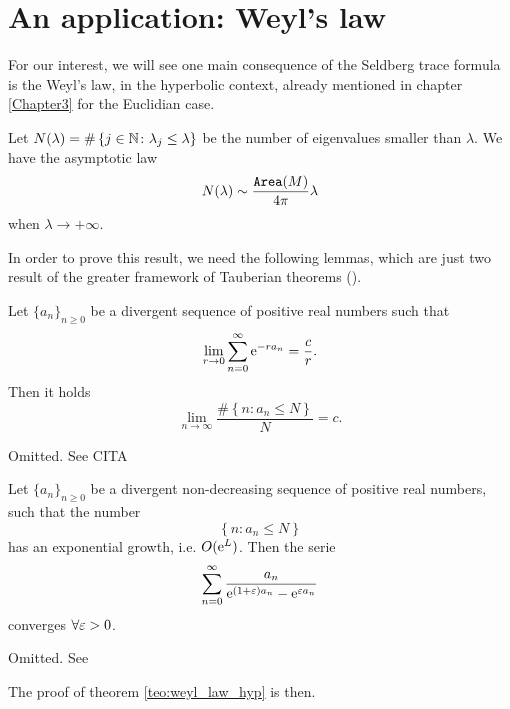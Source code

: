 \section{An application: Weyl's law}


For our interest, we will see one main consequence of the Seldberg trace formula is the Weyl's law, in the hyperbolic context, already mentioned in chapter \ref{Chapter3} for the Euclidian case.


\begin{nteo}
\label{teo:weyl_law_hyp}
Let $N(\lambda)=\#\left\{j\in\mathbb{N}\colon\lambda_{j}\leq\lambda\right\}$ be the number of eigenvalues smaller than $\lambda$. We have the asymptotic law 
\[
N(\lambda)\sim\frac{\operatorname{\mathtt{Area}}(M)}{4\pi}\lambda
\]
when $\lambda\to+\infty$.
\end{nteo}

In order to prove this result, we need the following lemmas, which are just two result of the greater framework of Tauberian theorems (\cite{Korevaar:TauberianBookHistory}).

\begin{nlem}[Karamata]
\label{lem:taub_karamata}
Let $\{a_{n}\}_{n\geq0}$ be a divergent sequence of positive real numbers such that
\[
\lim_{r\to0}\sum_{n=0}^{\infty}\mathrm{e}^{-r a_{n}}=\frac{c}{r}.
\]
Then it holds
\[
\lim_{n\to\infty}\frac{\#\left\{n\colon a_{n}\leq N\right\}}{N}=c.
\]
\end{nlem}
\begin{prf}
Omitted. See CITA
\end{prf}


\begin{nlem}
\label{lem:tauber2}
Let $\{a_{n}\}_{n\geq0}$ be a divergent non-decreasing sequence of positive real numbers, such that the number
\[
\left\{
n\colon a_{n}\leq N
\right\}
\]
has an exponential growth, i.e. $O(\mathrm{e}^{L})$. Then the serie
\[
\sum_{n=0}^{\infty}\frac{a_{n}}{\mathrm{e}^{(1+\varepsilon)a_{n}}-\mathrm{e}^{\varepsilon a_{n}}}
\]
converges $\forall\varepsilon>0$.
\end{nlem}
\begin{prf}
Omitted. See
\end{prf}

The proof of theorem \ref{teo:weyl_law_hyp} is then.

